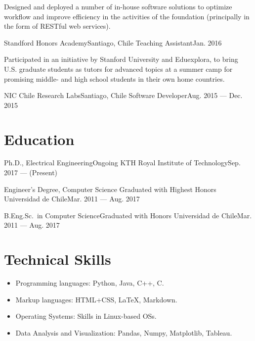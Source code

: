 \documentclass[letterpaper,10pt]{article}
\begin{document}
Designed and deployed a number of in-house software solutions to optimize workflow and improve efficiency in the activities of the foundation (principally in the form of RESTful web services).


\resumeSubheading
{Standford Honors Academy}{Santiago, Chile}
{Teaching Assistant}{Jan. 2016}

Participated in an initiative by Stanford University and Eduexplora, to bring U.S. graduate students as tutors for advanced topics at a summer camp for promising middle- and high school students in their own home countries.

\resumeSubheading
{NIC Chile Research Labs}{Santiago, Chile}
{Software Developer}{Aug. 2015 --- Dec. 2015}

\resumeSubHeadingListEnd


\section{Education} 
\resumeSubHeadingListStart
\resumeSubheading
{Ph.D., Electrical Engineering}{Ongoing}
{KTH Royal Institute of Technology}{Sep. 2017 --- (Present)}

\resumeSubheading
{Engineer's Degree, Computer Science} {Graduated with Highest Honors}
{Universidad de Chile}{Mar. 2011 --- Aug. 2017}

\resumeSubheading
{B.Eng.Sc.\ in Computer Science}{Graduated with Honors}
{Universidad de Chile}{Mar. 2011 --- Aug. 2017}
\resumeSubHeadingListEnd

\section{Technical Skills}
\begin{itemize}[leftmargin=*]
  \item Programming languages: Python, Java, C++, C.
  \vspace{-5pt}\item Markup languages: HTML+CSS, \LaTeX, Markdown.
  \vspace{-5pt}\item Operating Systems: Skills in Linux-based OSs.
  \vspace{-5pt}\item Data Analysis and Visualization: Pandas, Numpy, Matplotlib, Tableau.
\end{itemize}
\end{document}

